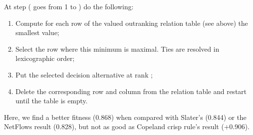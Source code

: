 \documentclass[a4paper,10pt,english]{sphinxhowto}
\begin{document}
At step  ( goes from 1 to ) do the following:
\begin{enumerate}
%
\item {} 
Compute for each row of the valued outranking relation table (see above) the smallest value;

\item {} 
Select the row where this minimum is maximal. Ties are resolved in lexicographic order;

\item {} 
Put the selected decision alternative at rank ;

\item {} 
Delete the corresponding row and column from the relation table and restart until the table is empty.

\end{enumerate}

\begin{sphinxVerbatim}[commandchars=\\\{\},numbers=left,firstnumber=1,stepnumber=1]
\end{sphinxVerbatim}

Here, we find a better fitness (0.868) when compared with Slater’s (0.844) or the Net\sphinxhyphen{}Flows result (0.828), but not as good as Copeland crisp rule’s result (+0.906).
\end{document}
